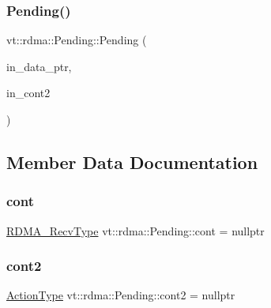 \subsubsection{\texorpdfstring{Pending()}{Pending()}\hspace{0.1cm}{\footnotesize\ttfamily [3/3]}}
{\footnotesize\ttfamily vt\+::rdma\+::\+Pending\+::\+Pending (\begin{DoxyParamCaption}\item[{\hyperlink{namespacevt_a9e2c953286c7616f7c218e9951790776}{R\+D\+M\+A\+\_\+\+Ptr\+Type}}]{in\+\_\+data\+\_\+ptr,  }\item[{\hyperlink{namespacevt_ae0a5a7b18cc99d7b732cb4d44f46b0f3}{Action\+Type}}]{in\+\_\+cont2 }\end{DoxyParamCaption})\hspace{0.3cm}{\ttfamily [inline]}}



\subsection{Member Data Documentation}
\mbox{\label{structvt_1_1rdma_1_1_pending_a379b732d7dfcd5fd42346c85583b8e08}} 
\subsubsection{\texorpdfstring{cont}{cont}}
{\footnotesize\ttfamily \hyperlink{namespacevt_1_1rdma_aa07fa86d8eca8853254b40fc0e565726}{R\+D\+M\+A\+\_\+\+Recv\+Type} vt\+::rdma\+::\+Pending\+::cont = nullptr}

\mbox{\label{structvt_1_1rdma_1_1_pending_a55d01ceada3293160e3167eb7194b9bd}} 
\subsubsection{\texorpdfstring{cont2}{cont2}}
{\footnotesize\ttfamily \hyperlink{namespacevt_ae0a5a7b18cc99d7b732cb4d44f46b0f3}{Action\+Type} vt\+::rdma\+::\+Pending\+::cont2 = nullptr}

\mbox{\label{structvt_1_1rdma_1_1_pending_afcbb4951a3cfaa8981063487c0b90548}} 

